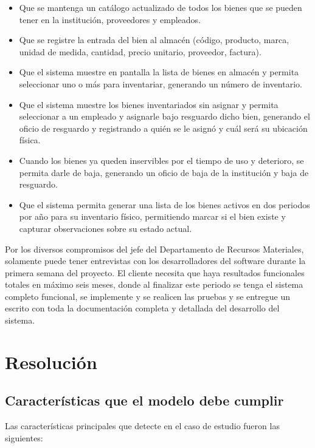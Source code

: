 \documentclass[spanish,12pt,letterpapper]{article}
\begin{document}
	\begin{itemize}
    \item Que se mantenga un catálogo actualizado de todos los bienes que se pueden tener en la institución, proveedores y empleados. 

    \item Que se registre la entrada del bien al almacén (código, producto, marca, unidad de medida, cantidad, precio unitario, proveedor, factura). 

    \item Que el sistema muestre en pantalla la lista de bienes en almacén y permita seleccionar uno o más para inventariar, generando un número de inventario. 

    \item Que el sistema muestre los bienes inventariados sin asignar y permita seleccionar a un empleado y asignarle bajo resguardo dicho bien, generando el oficio de resguardo y registrando a quién se le asignó y cuál será su ubicación física. 

    \item Cuando los bienes ya queden inservibles por el tiempo de uso y deterioro, se permita darle de baja, generando un oficio de baja de la institución y baja de resguardo. 

    \item Que el sistema permita generar una lista de los bienes activos en dos periodos por año para su inventario físico, permitiendo marcar si el bien existe y capturar observaciones sobre su estado actual.   
    	\end{itemize}

Por los diversos compromisos del jefe del Departamento de Recursos Materiales, solamente puede tener entrevistas con los desarrolladores del software durante la primera semana del proyecto. El cliente necesita que haya resultados funcionales totales en máximo seis meses, donde al finalizar este periodo se tenga el sistema completo funcional, se implemente y se realicen las pruebas y se entregue un escrito con toda la documentación completa y detallada del desarrollo del sistema.

   
   \section{Resolución}
   \subsection{Características que el modelo debe cumplir}
   Las características principales que detecte en el caso de estudio fueron las siguientes:
   
\end{document}
